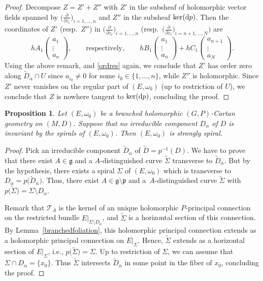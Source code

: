 \documentclass[10pt,a4paper]{amsart}
\newcommand{\der}[2]{\frac{\partial #1}{\partial#2}}
\numberwithin{equation}{section}
\newtheorem{Proposition}[Theorem]{Proposition}
 { \theoremstyle{definition}
\newtheorem{Definition}[Theorem]{Definition}
\newtheorem{Note}[Theorem]{Note}
\newtheorem{Exemple}[Theorem]{Example}
\newtheorem{Remark}[Theorem]{Remark} }
\begin{document}
\begin{proof}
Decompose $Z=Z'+Z''$ with $Z'$ in the subsheaf of holomorphic vector fields spanned by $\big(\der{}{z_i}\big)_{i=1,\dots,n}$ and $Z''$ in the subsheaf $\ker({\rm d}p)$. Then the coordinates of $Z'$ (resp.\ $Z''$) in $\big(\der{}{z_i}\big)_{i=1,\dots,n}$ \big(resp.\ $\big(\der{}{z_i}\big)_{i=n+1,\dots,N}\big)$ are
\[
h A_1 \begin{pmatrix} a_1\\ \vdots \\ a_n \end{pmatrix}, \qquad \text{respectively},\qquad
h B_1 \begin{pmatrix} a_1 \\ \vdots \\ a_n \end{pmatrix} + h C_1 \begin{pmatrix} a_{n+1}\\ \vdots \\ a_N \end{pmatrix}.\]
 Using the above remark, and \eqref{ordres} again, we conclude that $Z'$ has order zero along $\tilde{D}_\alpha \cap U$ since $a_{i_0}\neq 0$ for some $i_0 \in \{1,\dots,n\}$, while $Z''$ is holomorphic. Since $Z'$ never vanishes on the regular part of $(E,\omega_0)$ (up to restriction of $U$), we conclude that $Z$ is nowhere tangent to $\ker({\rm d}p)$, concluding the proof.
\end{proof}

\begin{Proposition}\label{branchedtaucondition} Let $(E,\omega_0)$ be a branched holomorphic $(G,P)$-Cartan geometry on $(M,D)$. Suppose that no irreducible component $D_\alpha$ of $D$ is invariant by the spirals of $(E,\omega_0)$. Then $(E,\omega_0)$ is strongly spiral. \end{Proposition}

\begin{proof} Pick an irreducible component $\tilde{D}_\alpha$ of $\tilde{D}=p^{-1}(D)$. We have to prove that there exist $A\in \mathfrak{g}$ and a $A$-distinguished curve $\tilde{\Sigma}$ transverse to $\tilde{D}_\alpha$. But by the hypothesis, there exists a spiral $\Sigma$ of $(E,\omega_0)$ which is transverse to $D_\alpha = p\big(\tilde{D}_\alpha\big)$. Thus, there exist $A\in \mathfrak{g}\setminus \mathfrak{p}$ and a~$A$-distinguished curve $\tilde{\Sigma}$ with $p\big(\tilde{\Sigma}\big)= \Sigma \setminus D_\alpha$.

Remark that $\mathcal{T}_A$ is the kernel of an unique holomorphic $P$-principal connection on the restricted bundle $E\vert_{\Sigma\setminus D_\alpha}$, and $\tilde{\Sigma}$ is a horizontal section of this connection. By Lemma~\ref{branchedfoliation}, this holomorphic principal connection extends as a holomorphic principal connection on $E\vert_{\Sigma}$. Hence, $\tilde{\Sigma}$ extends as a horizontal section of $E\vert_{\Sigma}$, i.e., $p\big(\tilde{\Sigma}\big)=\Sigma$.
Up to restriction of $\Sigma$, we can assume that $\Sigma \cap D_\alpha =\{x_0\}$. Thus $\tilde{\Sigma}$ intersects $\tilde{D}_\alpha$ in some point in the fiber of $x_0$, concluding the proof.
\end{proof}
\end{document}
